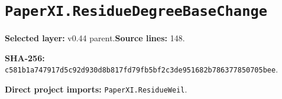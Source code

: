 \documentclass[10pt,oneside]{book}
\begin{document}
\section{\texorpdfstring{\nolinkurl{PaperXI.ResidueDegreeBaseChange}}{PaperXI.ResidueDegreeBaseChange}}\label{module:PaperXI.ResidueDegreeBaseChange}

\textbf{Selected layer:} v0.44 parent.\quad\textbf{Source lines:} 148.\par\textbf{SHA-256:} {\scriptsize\nolinkurl{c581b1a747917d5c92d930d8b817fd79fb5bf2c3de951682b786377850705bee}}.


\textbf{Direct project imports:} \nolinkurl{PaperXI.ResidueWeil}.
\end{document}

